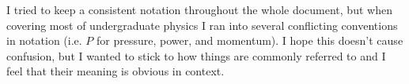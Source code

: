 I tried to keep a consistent notation throughout the whole document, but when covering most of undergraduate physics I ran into several conflicting conventions in notation (i.e. \(P\) for pressure, power, and momentum).
I hope this doesn't cause confusion, but I wanted to stick to how things are commonly referred to and I feel that their meaning is obvious in context.
